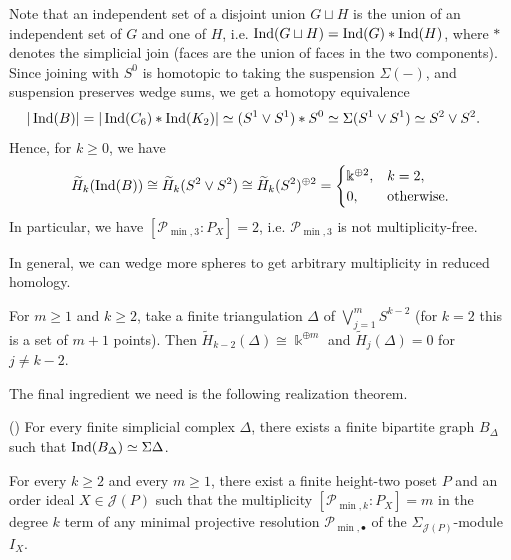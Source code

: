 \documentclass[a4paper,leqno]{amsart}
\begin{document}
\begin{eg}
Note that an independent set of a disjoint union $G\sqcup H$ is the union of an independent set of $G$ and one of $H$, i.e. $\operatorname{Ind}(G\sqcup H)=\operatorname{Ind}(G)\ast \operatorname{Ind}(H)$, where $\ast$ denotes the simplicial join (faces are the union of faces in the two components).  Since joining with $S^0$ is homotopic to taking the suspension $\Sigma(-)$, and suspension preserves wedge sums, we get a homotopy equivalence
\begin{align*}
 |\operatorname{Ind}(B)|
 &=|\operatorname{Ind}(C_6)*\operatorname{Ind}(K_2)| \simeq(S^1\vee S^1)*S^0
 \simeq\Sigma(S^1\vee S^1)\simeq S^2\vee S^2.
\end{align*}
Hence, for $k\ge 0$, we have
\[
\widetilde{H}_k(\operatorname{Ind}(B)) \cong  \widetilde{H}_k(S^2\vee S^2) \cong \widetilde{H}_k(S^2)^{\oplus 2} = \begin{cases}
    \Bbbk^{\oplus 2}, & k=2, \\ 0, & \text{otherwise.}
\end{cases}
\]
In particular, we have $[\mathcal{P}_{\min,3}:P_X]=2$, i.e. $\mathcal P_{\min,3}$ is not multiplicity-free.
\end{eg}

In general, we can wedge more spheres to get arbitrary multiplicity in reduced homology.

\begin{eg}\label{eg:complexes-with-arbitrary-homology}
For $m\geq1$ and $k\ge 2$, take a finite triangulation $\Delta$ of $\bigvee_{j=1}^{m}S^{k-2}$ (for $k=2$ this is a set of $m+1$ points). Then $\widetilde H_{k-2}(\Delta)\cong\Bbbk^{\oplus m}$ and $\widetilde H_j(\Delta)=0$ for $j\neq k-2$.
\end{eg}

The final ingredient we need is the following realization theorem.

\begin{prop}\textnormal{(\cite[Proposition~6.2]{NR09})}
\label{prop:nagel-reiner}
For every finite simplicial complex $\Delta$, there exists a finite bipartite graph $B_\Delta$ such that $\operatorname{Ind}(B_\Delta)\simeq\Sigma \Delta$.
\end{prop}

\begin{cor}\label{cor:arbitrary-higher-multiplicities}
For every $k\geq2$ and every $m\geq1$, there exist a finite height-two poset $P$ and an order ideal $X\in\mathcal J(P)$ such that the multiplicity $[\mathcal{P}_{\min,k}:P_X]=m$ in the degree $k$ term of any minimal projective resolution $\mathcal{P}_{\min,\bullet}$ of the $\Sigma_{\mathcal{J}(P)}$-module $I_X$.
\end{cor}
\end{document}
